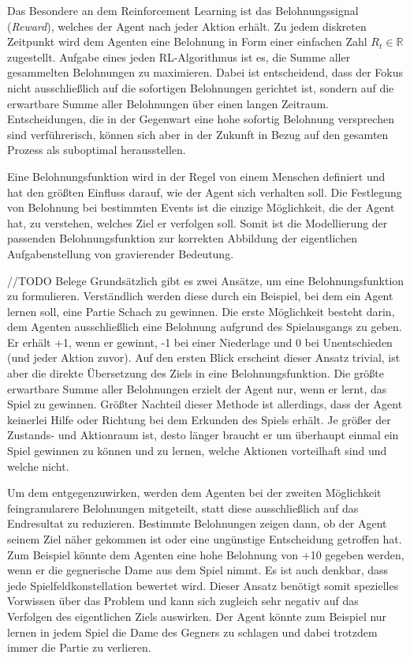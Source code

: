 Das Besondere an dem Reinforcement Learning ist das Belohnungssignal (\textit{Reward}), welches der Agent nach jeder Aktion erhält. Zu jedem diskreten Zeitpunkt wird dem Agenten eine Belohnung in Form einer einfachen Zahl $R_t \in \mathbb{R}$ zugestellt. Aufgabe eines jeden RL-Algorithmus ist es, die Summe aller gesammelten Belohnungen zu maximieren. Dabei ist entscheidend, dass der Fokus nicht ausschließlich auf die sofortigen Belohnungen gerichtet ist, sondern auf die erwartbare Summe aller Belohnungen über einen langen Zeitraum. Entscheidungen, die in der Gegenwart eine hohe sofortig Belohnung versprechen sind verführerisch, können sich aber in der Zukunft in Bezug auf den gesamten Prozess als suboptimal herausstellen. \cite[~S.53]{Sutton1998}
\par 
Eine Belohnungsfunktion wird in der Regel von einem Menschen definiert und hat den größten Einfluss darauf, wie der Agent sich verhalten soll. Die Festlegung von Belohnung bei bestimmten Events ist die einzige Möglichkeit, die der Agent hat, zu verstehen, welches Ziel er verfolgen soll. Somit ist die Modellierung der passenden Belohnungsfunktion zur korrekten Abbildung der eigentlichen Aufgabenstellung von gravierender Bedeutung.
\par 
//TODO Belege
Grundsätzlich gibt es zwei Ansätze, um eine Belohnungsfunktion zu formulieren. Verständlich werden diese durch ein Beispiel, bei dem ein Agent lernen soll, eine Partie Schach zu gewinnen. Die erste Möglichkeit besteht darin, dem Agenten ausschließlich eine Belohnung aufgrund des Spielausgangs zu geben. Er erhält +1, wenn er gewinnt, -1 bei einer Niederlage und 0 bei Unentschieden (und jeder Aktion zuvor). Auf den ersten Blick erscheint dieser Ansatz trivial, ist aber die direkte Übersetzung des Ziels in eine Belohnungsfunktion. Die größte erwartbare Summe aller Belohnungen erzielt der Agent nur, wenn er lernt, das Spiel zu gewinnen. Größter Nachteil dieser Methode ist allerdings, dass der Agent keinerlei Hilfe oder Richtung bei dem Erkunden des Spiels erhält. Je größer der Zustands- und Aktionraum ist, desto länger braucht er um überhaupt einmal ein Spiel gewinnen zu können und zu lernen, welche Aktionen vorteilhaft sind und welche nicht.
\par 
Um dem entgegenzuwirken, werden dem Agenten bei der zweiten Möglichkeit feingranularere Belohnungen mitgeteilt, statt diese ausschließlich auf das Endresultat zu reduzieren. Bestimmte Belohnungen zeigen dann, ob der Agent seinem Ziel näher gekommen ist oder eine ungünstige Entscheidung getroffen hat. Zum Beispiel könnte dem Agenten eine hohe Belohnung von +10 gegeben werden, wenn er die gegnerische Dame aus dem Spiel nimmt. Es ist auch denkbar, dass jede Spielfeldkonstellation bewertet wird. Dieser Ansatz benötigt somit spezielles Vorwissen über das Problem und kann sich zugleich sehr negativ auf das Verfolgen des eigentlichen Ziels auswirken. Der Agent könnte zum Beispiel nur lernen in jedem Spiel die Dame des Gegners zu schlagen und dabei trotzdem immer die Partie zu verlieren.
